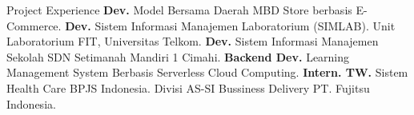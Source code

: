 \begin{rubric}{Project Experience}
\entry*[2018]%
	\textbf{Dev.} Model Bersama Daerah MBD Store berbasis E-Commerce.
%
\entry*[2017]%
	\textbf{Dev.} Sistem Informasi Manajemen Laboratorium (SIMLAB). Unit Laboratorium FIT, Universitas Telkom.
%
\entry*[2017]%
	\textbf{Dev.} Sistem Informasi Manajemen Sekolah SDN Setimanah Mandiri 1 Cimahi.
%
\entry*[2017]%
	\textbf{Backend Dev.} Learning Management System Berbasis Serverless Cloud Computing.
%
\entry*[2015]%
	\textbf{Intern. TW.} Sistem Health Care BPJS Indonesia. Divisi AS-SI Bussiness Delivery PT. Fujitsu Indonesia.
%
\end{rubric}